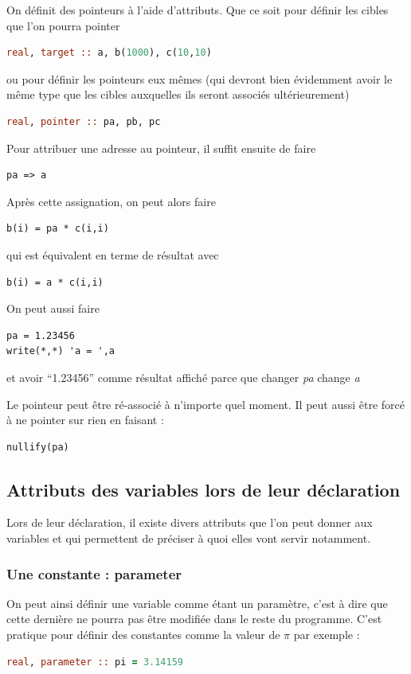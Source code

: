 \documentclass[a4paper,twoside]{article}
\begin{document}
On définit des pointeurs à l'aide d'attributs. Que ce soit pour définir les cibles que l'on pourra pointer
\begin{lstlisting}[language=Fortran]
real, target :: a, b(1000), c(10,10)
\end{lstlisting}
ou pour définir les pointeurs eux mêmes (qui devront bien évidemment avoir le même type que les cibles auxquelles ils seront associés ultérieurement)
\begin{lstlisting}[language=Fortran]
real, pointer :: pa, pb, pc
\end{lstlisting}

Pour attribuer une adresse au pointeur, il suffit ensuite de faire
\begin{verbatim}
pa => a
\end{verbatim}

Après cette assignation, on peut alors faire 
\begin{verbatim}
b(i) = pa * c(i,i)
\end{verbatim}
qui est équivalent en terme de résultat avec
\begin{verbatim}
b(i) = a * c(i,i)
\end{verbatim}

\bigskip

On peut aussi faire 
\begin{verbatim}
pa = 1.23456
write(*,*) 'a = ',a
\end{verbatim}
et avoir ``1.23456'' comme résultat affiché parce que changer \textit{pa} change \textit{a}

\bigskip

Le pointeur peut être ré-associé à n'importe quel moment. Il peut aussi être forcé à ne pointer sur rien en faisant : 
\begin{verbatim}
nullify(pa)
\end{verbatim}

\subsection{Attributs des variables lors de leur déclaration}
Lors de leur déclaration, il existe divers attributs que l'on peut donner aux variables et qui permettent de préciser à quoi elles vont servir notamment. 

\subsubsection{Une constante : parameter}

On peut ainsi définir une variable comme étant un paramètre, c'est à dire que cette dernière ne pourra pas être modifiée dans le reste du programme. C'est pratique pour définir des constantes comme la valeur de $\pi$ par exemple : 
\begin{lstlisting}[language=Fortran]
real, parameter :: pi = 3.14159
\end{lstlisting}
\end{document}
